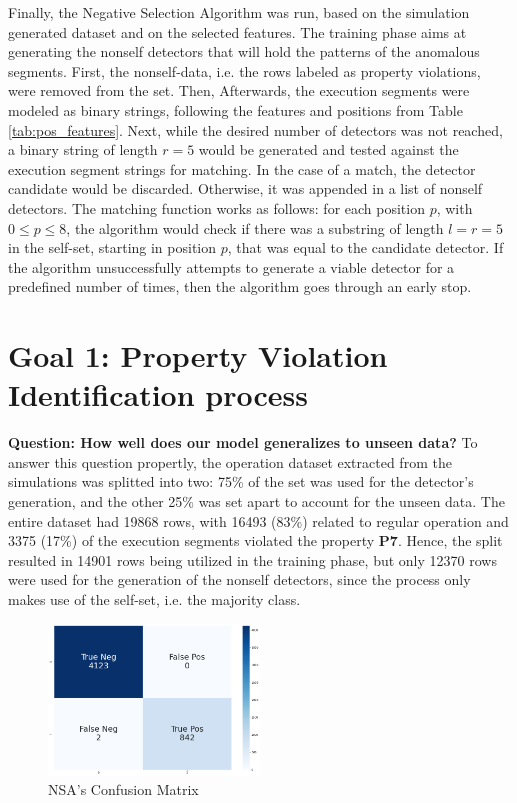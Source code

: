 Finally, the Negative Selection Algorithm was run, based on the simulation generated dataset and on the selected features. The training phase aims at generating the nonself detectors that will hold the patterns of the anomalous segments. First, the nonself-data, i.e. the rows labeled as property violations, were removed from the set. Then, Afterwards, the execution segments were modeled as binary strings, following the features and positions from Table \ref{tab:pos_features}. Next, while the desired number of detectors was not reached, a binary string of length \(r = 5\) would be generated and tested against the execution segment strings for matching. In the case of a match, the detector candidate would be discarded. Otherwise, it was appended in a list of nonself detectors. The matching function works as follows: for each position \(p\), with \(0 \leq p \leq 8\), the algorithm would check if there was a substring of length \(l=r=5\) in the self-set, starting in position \(p\), that was equal to the candidate detector. If the algorithm unsuccessfully attempts to generate a viable detector for a predefined number of times, then the algorithm goes through an early stop.

\section{Goal 1: Property Violation Identification process}

\textbf{Question: How well does our model generalizes to unseen data?} To answer this question propertly, the operation dataset extracted from the simulations was splitted into two: 75\% of the set was used for the detector's generation, and the other 25\% was set apart to account for the unseen data. The entire dataset had 19868 rows, with 16493 (83\%) related to regular operation and 3375 (17\%) of the execution segments violated the property \textbf{P7}. Hence, the split resulted in 14901 rows being utilized in the training phase, but only 12370 rows were used for the generation of the nonself detectors, since the process only makes use of the self-set, i.e. the majority class.

\begin{figure}[!h]
	\centering
	\includegraphics[width=0.5\textwidth, keepaspectratio]{img/NSA_confusion_matrix.png}
	\caption{NSA's Confusion Matrix}
	\label{fig:nsa_conf}
\end{figure}

